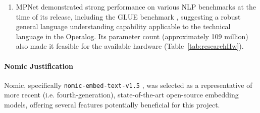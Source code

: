 \documentclass[10pt,oneside]{report}
\begin{document}
\begin{enumerate}
    \item MPNet demonstrated strong performance on various NLP benchmarks at the time of its release, including the GLUE benchmark \cite{wang2018glue, song2020mpnet}, suggesting a robust general language understanding capability applicable to the technical language in the Operalog. Its parameter count (approximately 109 million) also made it feasible for the available hardware (Table~\ref{tab:researchHw}).
\end{enumerate}

\paragraph{Nomic Justification}
Nomic, specifically \texttt{nomic-embed-text-v1.5} \cite{nussbaum2024nomic, nussbaum2024nomic1.5}, was selected as a representative of more recent (i.e. fourth-generation), state-of-the-art open-source embedding models, offering several features potentially beneficial for this project.
\end{document}
